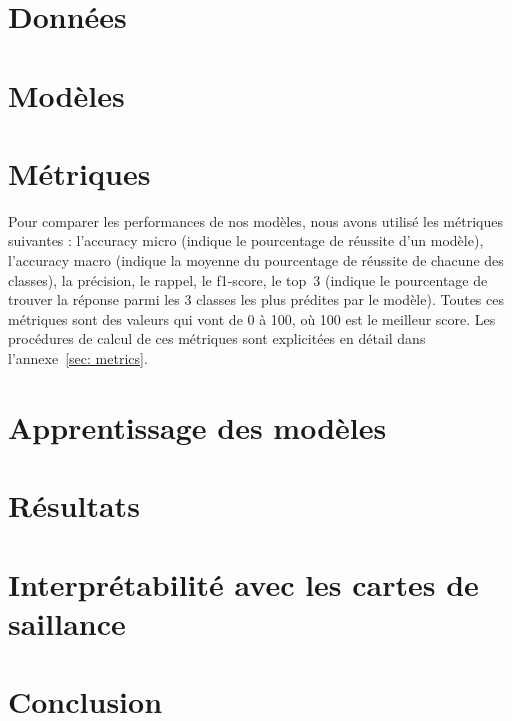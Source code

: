 \documentclass[a4paper]{article}
\begin{document}
\section{Données}


\section{Modèles}


\section{Métriques}
Pour comparer les performances de nos modèles, nous avons utilisé les métriques suivantes : l'accuracy micro (indique le pourcentage de réussite d'un modèle), l'accuracy macro (indique la moyenne du pourcentage de réussite de chacune des classes), la précision, le rappel, le f1-score, le top~3 (indique le pourcentage de trouver la réponse parmi les 3 classes les plus prédites par le modèle). Toutes ces métriques sont des valeurs qui vont de 0 à 100, où 100 est le meilleur score. 
Les procédures de calcul de ces métriques sont explicitées en détail dans l'annexe~\ref{sec: metrics}.

\section{Apprentissage des modèles}


% 

\section{Résultats}


\section{Interprétabilité avec les cartes de saillance}


\section{Conclusion}
\end{document}
